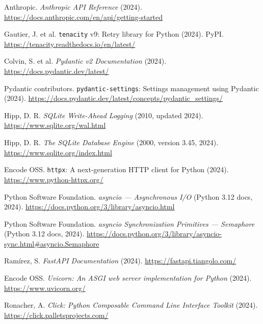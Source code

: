 \documentclass[11pt,a4paper]{article}
\begin{document}
\begin{enumerate}[label={[\arabic*]},leftmargin=2.4em,itemsep=2pt]

  \item Anthropic. \textit{Anthropic API Reference} (2024).
        \url{https://docs.anthropic.com/en/api/getting-started}

  \item Gautier, J. et al. \texttt{tenacity} v9: Retry library for Python (2024).
        PyPI. \url{https://tenacity.readthedocs.io/en/latest/}

  \item Colvin, S. et al. \textit{Pydantic v2 Documentation} (2024).
        \url{https://docs.pydantic.dev/latest/}
  \item Pydantic contributors. \texttt{pydantic-settings}: Settings management using Pydantic (2024).
        \url{https://docs.pydantic.dev/latest/concepts/pydantic_settings/}

  \item Hipp, D. R. \textit{SQLite Write-Ahead Logging} (2010, updated 2024).
        \url{https://www.sqlite.org/wal.html}
  \item Hipp, D. R. \textit{The SQLite Database Engine} (2000, version 3.45, 2024).
        \url{https://www.sqlite.org/index.html}

  \item Encode OSS. \texttt{httpx}: A next-generation HTTP client for Python (2024).
        \url{https://www.python-httpx.org/}

  \item Python Software Foundation. \textit{asyncio --- Asynchronous I/O} (Python 3.12 docs, 2024).
        \url{https://docs.python.org/3/library/asyncio.html}
  \item Python Software Foundation. \textit{asyncio Synchronization Primitives --- Semaphore} (Python 3.12 docs, 2024).
        \url{https://docs.python.org/3/library/asyncio-sync.html\#asyncio.Semaphore}

  \item Ram\'irez, S. \textit{FastAPI Documentation} (2024).
        \url{https://fastapi.tiangolo.com/}
  \item Encode OSS. \textit{Uvicorn: An ASGI web server implementation for Python} (2024).
        \url{https://www.uvicorn.org/}

  \item Ronacher, A. \textit{Click: Python Composable Command Line Interface Toolkit} (2024).
        \url{https://click.palletsprojects.com/}


\end{enumerate}
\end{document}
